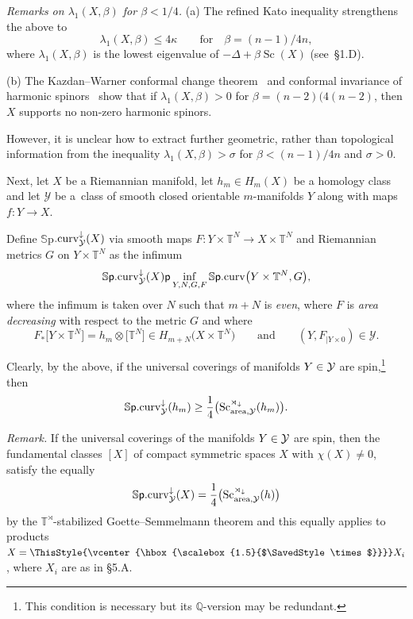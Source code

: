 \documentclass[10pt,a4paper]{amsart}
\numberwithin{equation}{section}
\newcommand\bigtimes{\mathbin{\ThisStyle{\vcenter{\hbox{%
\scalebox{1.5}{$\SavedStyle\times$}}}}}}
\begin{document}
{\it Remarks on $\lambda_1(X, \beta)$ for $\beta<1/4$.} (a) The refined Kato inequality strengthens the above to
\[
\lambda_1(X,\beta)\leq 4\kappa \qquad \text{for}\quad \beta= (n-1)/4n,
\]
where $\lambda_1(X,\beta)$ is the lowest eigenvalue of $-\Delta+\beta \operatorname{Sc}(X)$ (see~\S1.D).

(b) The Kazdan--Warner conformal change theorem~\cite{KW1975}
and conformal invariance of harmonic spinors~\cite{Hi1974} show that
 if $\lambda_1(X,\beta)>0$ for $\beta=(n-2)(4(n-2)$, then
$X$ supports no non-zero harmonic spinors.

However, it is unclear how to extract further geometric, rather than topological information from
 the inequality $\lambda_1(X,\beta)> \sigma $ for $\beta < (n-1)/4n$ and
 $\sigma>0$.

Next, let $X$ be a Riemannian manifold, let $h_m\in H_m(X)$
be a homology class and let $\mathcal Y $ be a~class of smooth closed orientable $m$-manifolds $Y$ along with maps
$f\colon Y\to X$.

 Define $ \mathbb S${\sf p}$.{\rm curv}^\downarrow _{\mathcal Y}(X)$ via smooth maps
$F \colon Y\times \mathbb T^N\to X\times \mathbb T^N$ and Riemannian metrics $G$ on $Y\times \mathbb T^N$ as the infimum
\[
\mathbb S\mbox{\sf p}.{\rm curv}^\downarrow _{\mathcal Y}(X)\mbox{\sf p}\inf_{ Y,N,G,F} \mathbb S\mbox{\sf p}.{\rm curv} \bigl(Y\times \mathbb T^N,G\bigr),
\]
where the infimum is taken over $N$ such that $m+N$ is {\it even}, where $F$ is {\it area decreasing} with respect to the metric $G$ and where
\[
F_\ast\bigl[Y\times\mathbb T^N\bigr]=h_m\otimes \bigl[\mathbb T^N\bigr]\in H_{m+N}\bigl(X\times \mathbb T^N\bigr) \qquad \text{and} \qquad (Y, F_{|Y\times 0})\in \mathcal Y.
\]

 Clearly, by the above,
if the universal coverings of manifolds $Y\in \cal Y$ are spin,\footnote{This condition is necessary but its $\mathbb Q$-version may be redundant.} then
\[
\mathbb S\mbox{\sf p}.{\rm curv}^\downarrow _{\mathcal Y}(h_m)\geq\frac{1}{4} \bigl(\operatorname{Sc}^{\rtimes _\downarrow}_{{\rm area},\mathcal Y }(h_m)\bigr).
\]

{\it Remark.} If the universal coverings of the manifolds $Y\in \cal Y$ are spin, then the fundamental classes $[X]$ of compact symmetric spaces $X$ with $\chi(X)\neq 0$, satisfy the equally
\[
\mathbb S\mbox{\sf p}.{\rm curv}^\downarrow _{\mathcal Y}(X)=\frac{1}{4} \bigl(\operatorname{Sc}^{\rtimes _\downarrow}_{{\rm area},\mathcal Y }(h)\bigr)
\]
 by the $\mathbb T^\rtimes$-stabilized Goette--Semmelmann theorem and this equally applies to products $X=\bigtimes X_i$, where $X_i$ are as in \S5.A.
\end{document}
